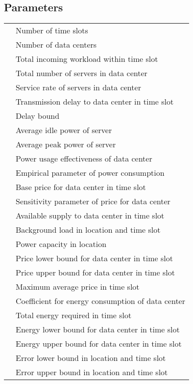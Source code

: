 \documentclass[journal]{IEEEtran}
\begin{document}
\subsection*{Parameters}
\begin{tabular}{l l}  &Number of time slots \\
	  &Number of data centers \\
	  &Total incoming workload within time slot  \\
	  &Total number of servers in data center \\
	  &Service rate of servers in data center  \\
	  &Transmission delay to data center  in time slot \\ 
	  &Delay bound\\ 
	  &Average idle power of server \\
	  &Average peak power of server \\
	  &Power usage effectiveness of data center \\
	   &Empirical parameter of power consumption\\
	  &Base price for data center  in time slot \\
	  &Sensitivity parameter of price for data center \\ 
	  &Available supply to data center  in time slot \\
	  &Background load in location  and time slot \\ 
	  &Power capacity in location  \\
	  &Price lower bound for data center  in time slot \\
	  &Price upper bound for data center  in time slot \\
	  &Maximum average price in time slot  \\
	  &Coefficient for energy consumption of data center  \\
	  &Total energy required in time slot  \\
	  &Energy lower bound for data center  in time slot  \\
	  &Energy upper bound for data center  in time slot  \\
	  &Error lower bound in location  and time slot  \\
	  &Error upper bound in location  and time slot 
\end{tabular}
\end{document}
